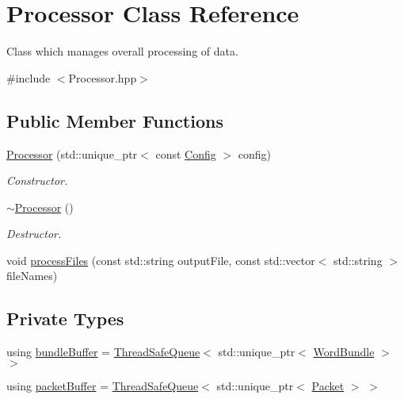 \hypertarget{class_processor}{}\section{Processor Class Reference}
\label{class_processor}


Class which manages overall processing of data.  




{\ttfamily \#include $<$Processor.\+hpp$>$}

\subsection*{Public Member Functions}
\begin{DoxyCompactItemize}
\item 
\hyperlink{class_processor_a1cc4421ebb02f40665336598c1334c55}{Processor} (std\+::unique\+\_\+ptr$<$ const \hyperlink{class_config}{Config} $>$ config)
\begin{DoxyCompactList}\small\item\em Constructor. \end{DoxyCompactList}\item 
\hyperlink{class_processor_acf37952c5b420d4e903a512571678692}{$\sim$\+Processor} ()
\begin{DoxyCompactList}\small\item\em Destructor. \end{DoxyCompactList}\item 
void \hyperlink{class_processor_ad3862d616c58f790ab6d3e9725ce5b10}{process\+Files} (const std\+::string output\+File, const std\+::vector$<$ std\+::string $>$ file\+Names)
\end{DoxyCompactItemize}
\subsection*{Private Types}
\begin{DoxyCompactItemize}
\item 
using \hyperlink{class_processor_a531b4c5f7c0d810fc6e9e1dd3d115725}{bundle\+Buffer} = \hyperlink{class_thread_safe_queue}{Thread\+Safe\+Queue}$<$ std\+::unique\+\_\+ptr$<$ \hyperlink{class_word_bundle}{Word\+Bundle} $>$ $>$
\item 
using \hyperlink{class_processor_a0cfd8ed0721769db91c142a19a392e0f}{packet\+Buffer} = \hyperlink{class_thread_safe_queue}{Thread\+Safe\+Queue}$<$ std\+::unique\+\_\+ptr$<$ \hyperlink{class_packet}{Packet} $>$ $>$
\end{DoxyCompactItemize}
